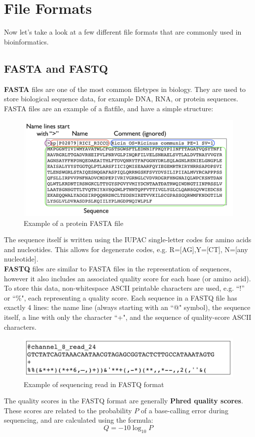 \documentclass[12pt]{article}
\begin{document}
\section{File Formats}
Now let's take a look at a few different file formats that are commonly used in bioinformatics.
\subsection{FASTA and FASTQ}
{\bf FASTA} files are one of the most common filetypes in biology. They are used to store biological sequence data, for example DNA, RNA, or protein sequences. FASTA files are an example of a flatfile, and have a simple structure:
\begin{figure}[h!]
    \centering
    \includegraphics[width=.9\linewidth]{fasta}
    \caption{Example of a protein FASTA file}
    \label{fig:fasta}
\end{figure}

The sequence itself is written using the IUPAC single-letter codes for amino acids and nucleotides. This allows for degenerate codes, e.g. R=[AG],Y=[CT], N=[any nucleotide].\\[10pt]
{\bf FASTQ} files are similar to FASTA files in the representation of sequences, however it also includes an associated quality score for each base (or amino acid). To store this data, non-whitespace ASCII printable characters are used, e.g. “!” or “\%", each representing a quality score. Each sequence in a FASTQ file has exactly 4 lines: the name line (always starting with an ``@" symbol), the sequence itself, a line with only the character ``+", and the sequence of quality-score ASCII characters.\\[10pt]
\begin{figure}[h]
    \centering
    \includegraphics[width=.9\linewidth]{fastq}
    \caption{Example of sequencing read in FASTQ format}
    \label{fig:fastq}
\end{figure}
The quality scores in the FASTQ format are generally {\bf Phred quality scores}. These scores are related to the probability $P$ of a base-calling error during sequencing, and are calculated using the formula:
$$Q = -10\log_{10} P$$
\end{document}

